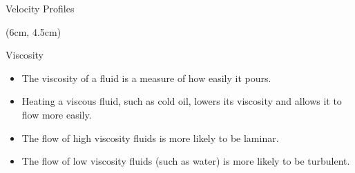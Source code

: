 \documentclass[9pt,xcolor={svgnames, x11names},professionalfonts, mathserif]{beamer}
\begin{document}
\begin{frame}{Velocity Profiles}
 \begin{textblock*}{5cm}(6cm, 4.5cm)
 \end{textblock*}


\end{frame}





\begin{frame}{Viscosity}
 \begin{itemize}
  \item The viscosity of a fluid is a measure of how easily it pours.\parb
  \item Heating a viscous fluid, such as cold oil, lowers its viscosity and allows it to flow more easily.\parb
  \item The flow of high viscosity fluids is more likely to be laminar.\parb
  \item The flow of low viscosity fluids (such as water) is more likely to be turbulent.
 \end{itemize}

\end{frame}
\end{document}
